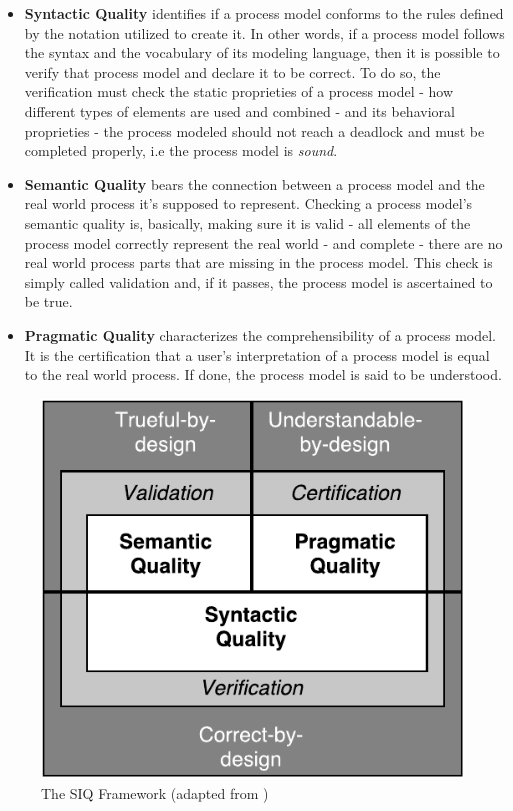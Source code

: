 \documentclass[a4paper,twoside]{article}
\begin{document}
\begin{itemize}
	\item \textbf{Syntactic Quality} identifies if a process model conforms to the rules defined by the notation utilized to create it. In other words, if a process model follows the syntax and the vocabulary of its modeling language, then it is possible to verify that process model and declare it to be correct. To do so, the verification must check the static proprieties of a process model - how different types of elements are used and combined - and its behavioral proprieties - the process modeled should not reach a deadlock and must be completed properly, i.e the process model is \textit{sound}.
	\item \textbf{Semantic Quality} bears the connection between a process model and the real world process it's supposed to represent. Checking a process model's semantic quality is, basically, making sure it is valid - all elements of the process model correctly represent the real world - and complete - there are no real world process parts that are missing in the process model. This check is simply called validation and, if it passes, the process model is ascertained to be true.
	\item \textbf{Pragmatic Quality} characterizes the comprehensibility of a process model. It is the certification that a user's interpretation of a process model is equal to the real world process. If done, the process model is said to be understood.
\end{itemize}


\begin{figure}
	\centering
	\includegraphics[scale=0.8]{SIQFramework.pdf}
	\caption{The SIQ Framework (adapted from \cite{Reijers2015})}
	\label{SIQFigure}
\end{figure}
\end{document}
